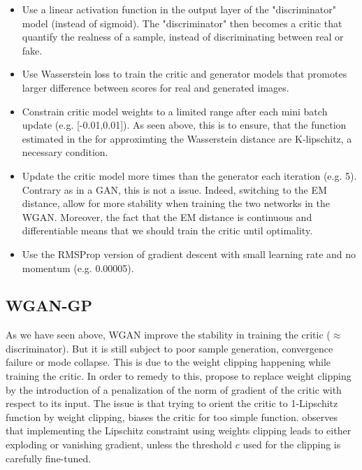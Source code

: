 \documentclass{article}
\begin{document}
\begin{itemize}
    \item Use a linear activation function in the output layer of the "discriminator" model (instead of sigmoid). The "discriminator" then becomes a critic that quantify the realness of a sample, instead of discriminating between real or fake.
    \item Use Wasserstein loss to train the critic and generator models that promotes larger difference between scores for real and generated images. 
    \item Constrain critic model weights to a limited range after each mini batch update (e.g. [-0.01,0.01]). As seen above, this is to ensure, that the function estimated in the for approximting the Wasserstein distance are K-lipschitz, a necessary condition.
    \item Update the critic model more times than the generator each iteration (e.g. 5). Contrary as in a GAN, this is not a issue. Indeed, switching to the EM distance, allow for more stability when training the two networks in the WGAN. Moreover, the fact that the EM distance is continuous and differentiable means that we should train the critic until optimality.
    \item Use the RMSProp version of gradient descent with small learning rate and no momentum (e.g. 0.00005).
    
\end{itemize}


\subsection{WGAN-GP}

As we have seen above, WGAN improve the stability in training the critic ($\approx$ discriminator). But it is still subject to poor sample generation, convergence failure or mode collapse. This is due to the weight clipping happening while training the critic. In order to remedy to this, \cite{DBLP:journals/corr/GulrajaniAADC17} propose to replace weight clipping by the introduction of a penalization of the norm of gradient of the critic with respect to its input. The issue is that trying to orient the critic to 1-Lipschitz function by weight clipping, biases the critic for too simple function. \cite{DBLP:journals/corr/GulrajaniAADC17} observes that implementing the Lipschitz constraint using weights clipping leads to either exploding or vanishing gradient, unless the threshold $c$ used for the clipping is carefully fine-tuned.
\end{document}
